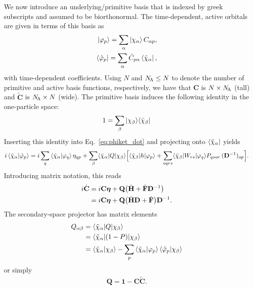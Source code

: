 \documentclass[aip,jcp,preprint,superscriptaddress,nofootinbib]{revtex4-1}
\begin{document}
We now introduce an underlying/primitive basis that is indexed by greek subscripts and assumed to be biorthonormal.
The time-dependent, active orbitals are given in terms of this basis as
\begin{align}
    \ket{\varphi_{p}} = \sum_{\alpha} \ket{\chi_{\alpha}} C_{\alpha p},         \label{eq:phi_ket_expansion} \\
    \bra{\tilde{\varphi}_{p}} = \sum_{\alpha} \tilde{C}_{p \alpha} \bra{\tilde{\chi}_{\alpha}}, \label{eq:phi_bra_expansion}
\end{align}
with time-dependent coefficients. 
Using $N$ and $N_{\!\textsc{A}} \leq N$ to denote the number of primitive and active
basis functions, respectively, we have that
$\mathbf{C}$         is $N \times N_{\!\textsc{A}}$ (tall) and 
$\tilde{\mathbf{C}}$ is $N_{\!\textsc{A}} \times N$ (wide).
The primitive basis induces the following identity in
the one-particle space:
\begin{align}
    1 = \sum_{\beta} \ket{\chi_{\beta}} \! \bra{\tilde{\chi}_{\beta}} 
\end{align}
Inserting this identity into Eq.~\eqref{eq:phiket_dot} and projecting onto $\bra{\tilde{\chi}_{\alpha}}$ yields
\begin{multline}
    i \braket{\tilde{\chi}_{\alpha} | \dot{\varphi}_{p}} 
    = i \sum_{q} \braket{\tilde{\chi}_{\alpha} | \varphi_{q}} \eta_{qp}
    + \sum_{\beta} \langle \tilde{\chi}_{\alpha} \vert Q \vert \chi_{\beta} \rangle \Big[
    \langle \tilde{\chi}_{\beta} \vert h \vert \varphi_{p} \rangle
    + \sum_{oqrs}  \langle \tilde{\chi}_{\beta} \vert W_{rs} \vert \varphi_{q} \rangle P_{qsor} \, (\mathbf{D}^{-1})_{op}
    \Big].
\end{multline}
Introducing matrix notation, this reads
\begin{align} \label{eq:C_dot}
    i \dot{\mathbf{C}} 
    &= i \mathbf{C} \bm{\eta} + 
    \mathbf{Q}  \big( \check{\mathbf{H}} + \check{\mathbf{F}} \mathbf{D}^{-1} \big) \nonumber\\
    &= i \mathbf{C} \bm{\eta} + 
    \mathbf{Q}  \big( \check{\mathbf{H}} \mathbf{D} + \check{\mathbf{F}} \big) \mathbf{D}^{-1} .
\end{align}
The secondary-space projector has matrix elements
\begin{align}
    Q_{\alpha \beta} 
    &= \langle \tilde{\chi}_{\alpha} \vert Q \vert \chi_{\beta} \rangle \nonumber\\
    &= \langle \tilde{\chi}_{\alpha} \vert (1 - P) \vert \chi_{\beta} \rangle \nonumber\\
    &= \braket{\tilde{\chi}_{\alpha} | \chi_{\beta}} - \sum_{p} \braket{\tilde{\chi}_{\alpha} | \varphi_{p}} \braket{\tilde{\varphi}_{p} | \chi_{\beta}}
\end{align}
or simply
\begin{align}
    \mathbf{Q} = \mathbf{1} - \mathbf{C} \tilde{\mathbf{C}}.
\end{align}
\end{document}

